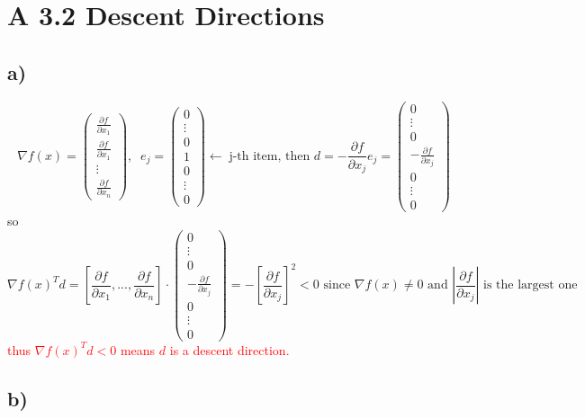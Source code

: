 \documentclass{article}
\newcommand{\subs}[1]{\subsection*{#1}}
\newcommand{\secs}[1]{\section*{#1}}
\begin{document}
\secs{A 3.2 Descent Directions}
\subs{a)}
\[
\nabla f(x) = \begin{pmatrix}
    \frac{\partial f}{\partial x_1}\\
    \frac{\partial f}{\partial x_1}\\
    \vdots \\
    \frac{\partial f}{\partial x_n}
\end{pmatrix},\;\;
e_j = \begin{pmatrix}
    0\\
    \vdots\\
    0\\
    1\\
    0\\
    \vdots\\
    0
\end{pmatrix} \leftarrow\;\text{j-th item, then }
d = -\frac{\partial f}{\partial x_j} e_j = \begin{pmatrix}
    0\\
    \vdots\\
    0\\
    -\frac{\partial f}{\partial x_j}\\
    0\\
    \vdots\\
    0
\end{pmatrix}
\]
so
\[
\nabla f(x)^T d = \left[\frac{\partial f}{\partial x_1},...,\frac{\partial f}{\partial x_n}\right]\cdot \begin{pmatrix}
0\\
\vdots\\
0\\
-\frac{\partial f}{\partial x_j}\\
0\\
\vdots\\
0
\end{pmatrix} = -\left[\frac{\partial f}{\partial x_j}\right]^2 < 0 \text{ since }\nabla f(x)\neq 0 \text{ and } \left|\frac{\partial f}{\partial x_j}\right| \text{ is the largest one}
\]
\textcolor{red}{thus $\nabla f(x)^T d <0$ means $d$ is a descent direction.}


\subs{b)}
\end{document}
